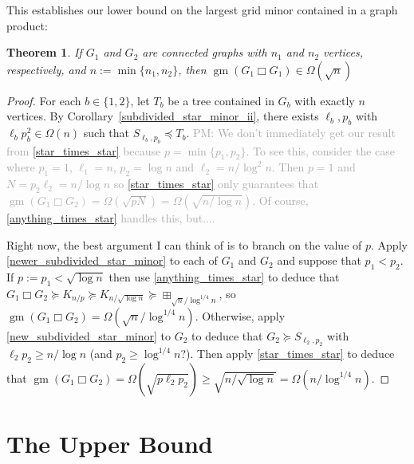 \documentclass[12pt]{article}
\newcommand{\boxprod}{\mathbin{\Box}}
\renewcommand{\ge}{\geqslant}
\DeclareMathOperator{\gm}{gm}
\newcommand{\pat}[1]{\textcolor{DarkGrey}{PM: #1}}
\theoremstyle{plain}
\newtheorem{thm}{Theorem}
\theoremstyle{definition}
\begin{document}
This establishes our lower bound on the largest grid minor contained in a graph product:

\begin{thm}\label{lower_bound}
  If $G_1$ and $G_2$ are connected graphs with $n_1$ and $n_2$ vertices, respectively, and $n:=\min\{n_1,n_2\}$, then $\gm(G_1\boxprod G_1)\in\Omega(\sqrt{n})$
\end{thm}

\begin{proof}
  For each $b\in\{1,2\}$, let $T_b$ be a tree contained in $G_b$ with exactly $n$ vertices.  By Corollary~\ref{subdivided_star_minor_ii}, there exists $\ell_b,p_b$ with $\ell_b p_b^2\in\Omega(n)$ such that $S_{\ell_b,p_b}\preceq T_b$. \pat{We don't immediately get our result from \cref{star_times_star} because $p=\min\{p_1,p_2\}$.  To see this, consider the case where $p_1=1$, $\ell_1=n$, $p_2=\log n$ and $\ell_2=n/\log^2 n$.  Then $p=1$ and $N=p_2\ell_2=n/\log n$ so \cref{star_times_star} only guarantees that $\gm(G_1\boxprod G_2)=\Omega(\sqrt{p N})=\Omega(\sqrt{n/\log n})$.  Of course, \cref{anything_times_star} handles this, but....}

  Right now, the best argument I can think of is to branch on the value of $p$.  Apply \cref{newer_subdivided_star_minor} to each of $G_1$ and $G_2$ and suppose that $p_1< p_2$.  If $p:=p_1 < \sqrt{\log n}$ then use \cref{anything_times_star} to deduce that $G_1\boxprod G_2\succeq K_{n/p}\succeq K_{n/\sqrt{\log n}}\succeq \boxplus_{\sqrt{n}/\log^{1/4} n}$, so $\gm(G_1\boxprod G_2)=\Omega(\sqrt{n}/\log^{1/4} n)$.  Otherwise, apply \cref{new_subdivided_star_minor} to $G_2$ to deduce that $G_2\succeq S_{\ell_2,p_2}$ with $\ell_2p_2 \ge n/\log n$ (and $p_2\ge \log^{1/4} n$?).  Then apply \cref{star_times_star} to deduce that $\gm(G_1\boxprod G_2)=\Omega(\sqrt{p\ell_2p_2}) \ge \sqrt{n/\sqrt{\log n}}=\Omega(n/\log^{1/4} n)$.
  
\end{proof}

\section{The Upper Bound}
\end{document}
